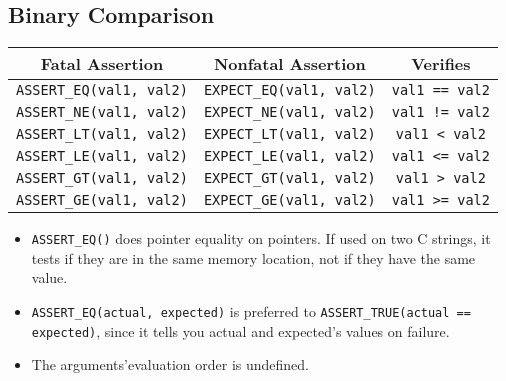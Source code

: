 \documentclass[letterpaper,11pt]{report}
\begin{document}
\subsection*{Binary Comparison}
\begin{center}
    \begin{tabular}{| c | c | c |}
        \hline
        \textbf{Fatal Assertion}         & \textbf{Nonfatal Assertion}     & \textbf{Verifies}     \\ \hline 
        \texttt{ASSERT\_EQ(val1, val2)}  & \texttt{EXPECT\_EQ(val1, val2)} & \texttt{val1 == val2} \\ \hline
        \texttt{ASSERT\_NE(val1, val2)}  & \texttt{EXPECT\_NE(val1, val2)} & \texttt{val1 != val2} \\ \hline
        \texttt{ASSERT\_LT(val1, val2)}  & \texttt{EXPECT\_LT(val1, val2)} & \texttt{val1 < val2}  \\ \hline
        \texttt{ASSERT\_LE(val1, val2)}  & \texttt{EXPECT\_LE(val1, val2)} & \texttt{val1 <= val2} \\ \hline
        \texttt{ASSERT\_GT(val1, val2)}  & \texttt{EXPECT\_GT(val1, val2)} & \texttt{val1 > val2}  \\ \hline
        \texttt{ASSERT\_GE(val1, val2)}  & \texttt{EXPECT\_GE(val1, val2)} & \texttt{val1 >= val2} \\ \hline
    \end{tabular}
\end{center}
\begin{itemize}
    \item \texttt{ASSERT\_EQ()} does pointer equality on pointers.
     If used on two C strings, it tests if they are in the same memory location, not if they have the same value.
    \item \texttt{ASSERT\_EQ(actual, expected)} is preferred to \texttt{ASSERT\_TRUE(actual == expected)}, since it tells you actual and expected's values on failure. 
    \item The arguments'evaluation order is undefined.
\end{itemize}
\end{document}
